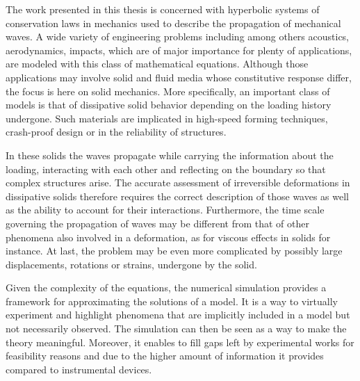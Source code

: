 The work presented in this thesis is concerned with hyperbolic systems of conservation laws in mechanics used to describe the propagation of mechanical waves.
A wide variety of engineering problems including among others acoustics, aerodynamics, impacts, which are of major importance for plenty of applications, are modeled with this class of mathematical equations. 
Although those applications may involve solid and fluid media whose constitutive response differ, the focus is here on solid mechanics.
More specifically, an important class of models is that of dissipative solid behavior depending on the loading history undergone.
Such materials are implicated in high-speed forming techniques, crash-proof design or in the reliability of structures.

In these solids the waves propagate while carrying the information about the loading, interacting with each other and reflecting on the boundary so that complex structures arise.
The accurate assessment of irreversible deformations in dissipative solids therefore requires the correct description of those waves as well as the ability to account for their interactions.
Furthermore, the time scale governing the propagation of waves may be different from that of other phenomena also involved in a deformation, as for viscous effects in solids for instance.
At last, the problem may be even more complicated by possibly large displacements, rotations or strains, undergone by the solid.


Given the complexity of the equations, the numerical simulation provides a framework for approximating the solutions of a model.
It is a way to virtually experiment and highlight phenomena that are implicitly included in a model but not necessarily observed.
The simulation can then be seen as a way to make the theory meaningful.
Moreover, it enables to fill gaps left by experimental works for feasibility reasons and due to the higher amount of information it provides compared to instrumental devices.

